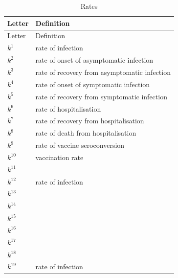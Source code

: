 \documentclass[
]{article}
\begin{document}
\begin{longtable}[]{@{}
  >{\centering\arraybackslash}p{}
  >{\centering\arraybackslash}p{}@{}}
\caption{Rates}\tabularnewline
\toprule
Letter & Definition \\
\midrule
\endfirsthead
\toprule
Letter & Definition \\
\midrule
\endhead
\(k^1\) & rate of infection \\
\(k^2\) & rate of onset of asymptomatic
infection \\
\(k^3\) & rate of recovery from
asymptomatic infection \\
\(k^4\) & rate of onset of symptomatic
infection \\
\(k^5\) & rate of recovery from
symptomatic infection \\
\(k^6\) & rate of hospitalisation \\
\(k^7\) & rate of recovery from
hospitalisation \\
\(k^8\) & rate of death from
hospitalisation \\
\(k^9\) & rate of vaccine seroconversion \\
\(k^{10}\) & vaccination rate \\
\(k^{11}\) & \\
\(k^{12}\) & rate of infection \\
\(k^{13}\) & \\
\(k^{14}\) & \\
\(k^{15}\) & \\
\(k^{16}\) & \\
\(k^{17}\) & \\
\(k^{18}\) & \\
\(k^{19}\) & rate of infection \\
\bottomrule
\end{longtable}
\end{document}
